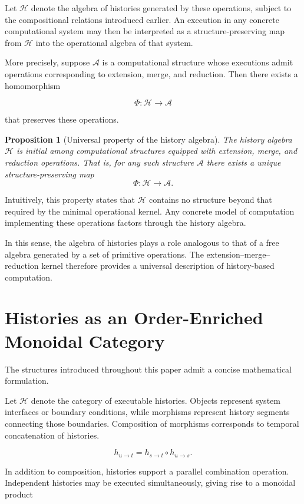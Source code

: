 \documentclass[12pt]{article}
\newtheorem{proposition}{Proposition}
\begin{document}
Let $\mathcal{H}$ denote the algebra of histories generated by these
operations, subject to the compositional relations introduced earlier.
An execution in any concrete computational system may then be interpreted
as a structure-preserving map from $\mathcal{H}$ into the operational
algebra of that system.

More precisely, suppose $\mathcal{A}$ is a computational structure whose
executions admit operations corresponding to extension, merge, and
reduction. Then there exists a homomorphism

\[
\Phi : \mathcal{H} \to \mathcal{A}
\]

that preserves these operations.

\begin{proposition}[Universal property of the history algebra]
The history algebra $\mathcal{H}$ is initial among computational
structures equipped with extension, merge, and reduction operations.
That is, for any such structure $\mathcal{A}$ there exists a unique
structure-preserving map
\[
\Phi : \mathcal{H} \to \mathcal{A}.
\]
\end{proposition}

Intuitively, this property states that $\mathcal{H}$ contains no
structure beyond that required by the minimal operational kernel.
Any concrete model of computation implementing these operations
factors through the history algebra.

In this sense, the algebra of histories plays a role analogous to that
of a free algebra generated by a set of primitive operations. The
extension–merge–reduction kernel therefore provides a universal
description of history-based computation.

\section{Histories as an Order-Enriched Monoidal Category}

The structures introduced throughout this paper admit a concise
mathematical formulation.

Let $\mathcal{H}$ denote the category of executable histories. Objects
represent system interfaces or boundary conditions, while morphisms
represent history segments connecting those boundaries. Composition of
morphisms corresponds to temporal concatenation of histories.

\[
h_{u\to t} = h_{s\to t} \circ h_{u\to s}.
\]

In addition to composition, histories support a parallel combination
operation. Independent histories may be executed simultaneously, giving
rise to a monoidal product
\end{document}
